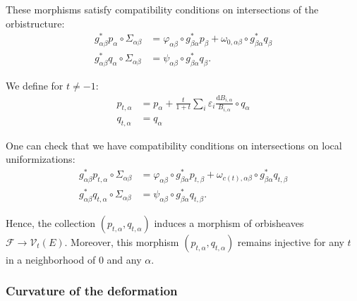 \documentclass[12pt,a4paper]{amsart}
\theoremstyle{plain}
\theoremstyle{definition}
\begin{document}
These morphisms satisfy compatibility conditions on intersections of the orbistructure:
\begin{align*}
    g_{\alpha\beta}^* p_\alpha \circ \Sigma_{\alpha\beta} & = \varphi_{\alpha\beta} \circ g_{\beta\alpha}^* p_\beta + \omega_{0, \alpha\beta} \circ g_{\beta\alpha}^* q_\beta \\
    g_{\alpha\beta}^* q_\alpha \circ \Sigma_{\alpha\beta} & = \psi_{\alpha\beta} \circ g_{\beta\alpha}^* q_\beta.
\end{align*}


We define for $t \neq -1$:
\begin{align*}
    p_{t, \alpha} & = p_\alpha + \frac{t}{1+t} \sum_i \varepsilon_i \frac{\mathrm{d}B_{i, \alpha}}{B_{i, \alpha}} \circ q_\alpha \\
    q_{t, \alpha} & = q_\alpha
\end{align*}


One can check that we have compatibility conditions on intersections on local uniformizations:
\begin{align*}
    g_{\alpha\beta}^* p_{t,\alpha} \circ \Sigma_{\alpha\beta} & = \varphi_{\alpha\beta} \circ g_{\beta\alpha}^* p_{t, \beta} + \omega_{c(t), \alpha\beta} \circ g_{\beta\alpha}^* q_{t, \beta} \\
    g_{\alpha\beta}^* q_{t, \alpha} \circ \Sigma_{\alpha\beta} & = \psi_{\alpha\beta} \circ g_{\beta\alpha}^* q_{t, \beta}.
\end{align*}


Hence, the collection $(p_{t, \alpha}, q_{t, \alpha})$ induces a morphism of orbisheaves $\mathcal{F} \to \mathcal{V}_t(E)$. Moreover, this morphism $(p_{t, \alpha}, q_{t, \alpha})$ remains injective for any $t$ in a neighborhood of $0$ and any $\alpha$.

\subsubsection{Curvature of the deformation}
\end{document}
